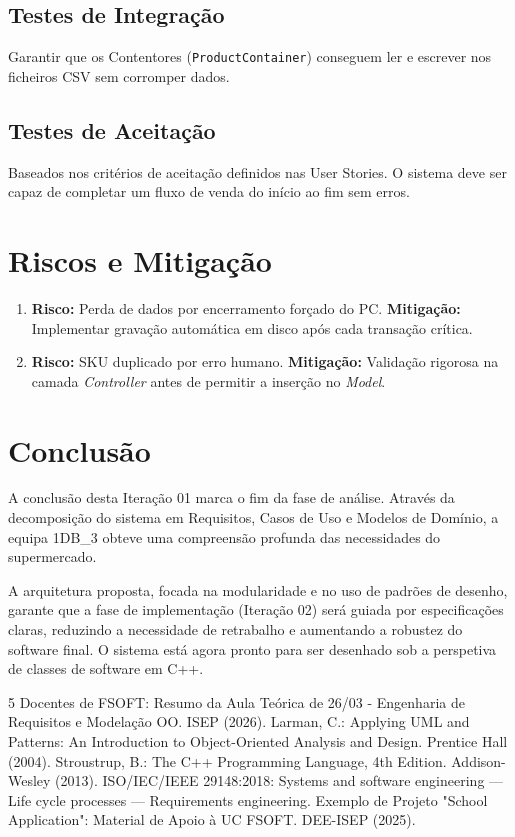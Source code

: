 \documentclass[runningheads,a4paper]{llncs}
\begin{document}
\subsection{Testes de Integração}
Garantir que os Contentores (\texttt{ProductContainer}) conseguem ler e escrever nos ficheiros CSV sem corromper dados.

\subsection{Testes de Aceitação}
Baseados nos critérios de aceitação definidos nas User Stories. O sistema deve ser capaz de completar um fluxo de venda do início ao fim sem erros.

\section{Riscos e Mitigação}
\begin{enumerate}
    \item \textbf{Risco:} Perda de dados por encerramento forçado do PC. \textbf{Mitigação:} Implementar gravação automática em disco após cada transação crítica.
    \item \textbf{Risco:} SKU duplicado por erro humano. \textbf{Mitigação:} Validação rigorosa na camada \textit{Controller} antes de permitir a inserção no \textit{Model}.
\end{enumerate}

\section{Conclusão}

A conclusão desta Iteração 01 marca o fim da fase de análise. Através da decomposição do sistema em Requisitos, Casos de Uso e Modelos de Domínio, a equipa 1DB\_3 obteve uma compreensão profunda das necessidades do supermercado. 

A arquitetura proposta, focada na modularidade e no uso de padrões de desenho, garante que a fase de implementação (Iteração 02) será guiada por especificações claras, reduzindo a necessidade de retrabalho e aumentando a robustez do software final. O sistema está agora pronto para ser desenhado sob a perspetiva de classes de software em C++.

\newpage

\begin{thebibliography}{5}
Docentes de FSOFT: Resumo da Aula Teórica de 26/03 - Engenharia de Requisitos e Modelação OO. ISEP (2026).
Larman, C.: Applying UML and Patterns: An Introduction to Object-Oriented Analysis and Design. Prentice Hall (2004).
Stroustrup, B.: The C++ Programming Language, 4th Edition. Addison-Wesley (2013).
ISO/IEC/IEEE 29148:2018: Systems and software engineering — Life cycle processes — Requirements engineering.
Exemplo de Projeto "School Application": Material de Apoio à UC FSOFT. DEE-ISEP (2025).
\end{thebibliography}
\end{document}
